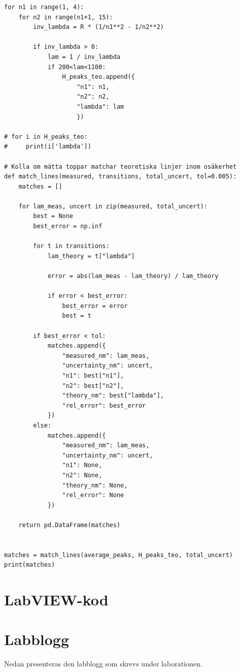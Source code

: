 \documentclass[12pt, a4paper]{article}
\begin{document}
\begin{lstlisting}[style=mypython]
for n1 in range(1, 4):
    for n2 in range(n1+1, 15):
        inv_lambda = R * (1/n1**2 - 1/n2**2)
            
        if inv_lambda > 0:
            lam = 1 / inv_lambda
            if 200<lam<1100:    
                H_peaks_teo.append({
                    "n1": n1,
                    "n2": n2,
                    "lambda": lam
                    })

# for i in H_peaks_teo:
#     print(i['lambda'])

# Kolla om mätta toppar matchar teoretiska linjer inom osäkerhet
def match_lines(measured, transitions, total_uncert, tol=0.005):
    matches = []
    
    for lam_meas, uncert in zip(measured, total_uncert):
        best = None
        best_error = np.inf
        
        for t in transitions:
            lam_theory = t["lambda"]
            
            error = abs(lam_meas - lam_theory) / lam_theory
            
            if error < best_error:
                best_error = error
                best = t
        
        if best_error < tol:
            matches.append({
                "measured_nm": lam_meas,
                "uncertainty_nm": uncert,
                "n1": best["n1"],
                "n2": best["n2"],
                "theory_nm": best["lambda"],
                "rel_error": best_error
            })
        else:
            matches.append({
                "measured_nm": lam_meas,
                "uncertainty_nm": uncert,
                "n1": None,
                "n2": None,
                "theory_nm": None,
                "rel_error": None
            })
    
    return pd.DataFrame(matches)


matches = match_lines(average_peaks, H_peaks_teo, total_uncert)
print(matches)
\end{lstlisting}
\section{LabVIEW-kod}
\label{app:LabVIEW}
\section{Labblogg}
\label{app:Labblogg}
Nedan presenteras den labblogg som skrevs under laborationen.

\end{document}
